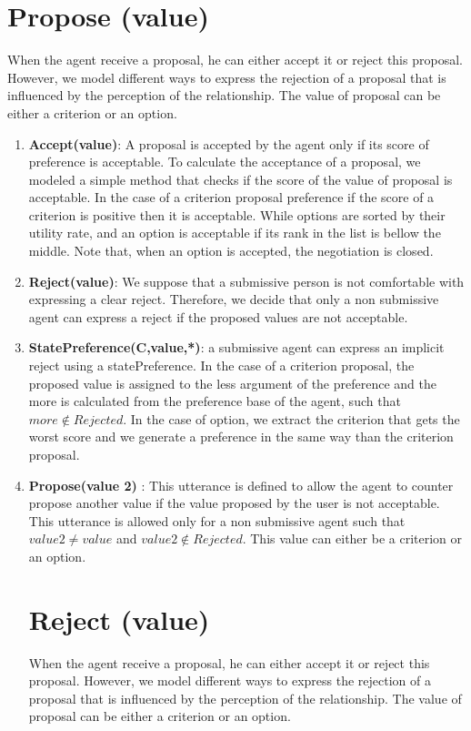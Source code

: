 \documentclass{llncs}
\begin{document}
\section{Propose (value)}
	\par When the agent receive a proposal, he can either accept it or reject this proposal. However, we model different ways to express the rejection of a proposal that is influenced by the perception of the relationship. The value of proposal can be either a criterion or an option.
		\begin{enumerate}
			
			\item \textbf{Accept(value)}: A proposal is accepted by the agent only if its score of preference is acceptable. To calculate the acceptance of a proposal, we modeled a simple method that checks if  the score of the value of proposal is acceptable. In the case of a criterion proposal  preference if the score of a criterion is positive then it is acceptable. While options are sorted by their utility rate, and an option is acceptable if its rank in the list is bellow the middle.  Note that, when an option is accepted, the negotiation is closed. 
			
			\item \textbf{Reject(value)}: We suppose that a submissive person is not comfortable with expressing a clear reject. Therefore, we decide that only a non submissive agent can express a reject if the proposed values are not acceptable. 
		
			\item \textbf{StatePreference(C,value,*)}: a submissive agent can express an implicit reject using a statePreference. In the case of a criterion proposal, the proposed value is assigned to the less argument of the preference and the more is calculated from the preference base of the agent, such that $more \notin Rejected$. In the case of option, we extract the criterion that gets the worst score and we generate a preference in the same way than the criterion proposal.
			
			\item \textbf{Propose(value 2)} : This utterance is defined to allow the agent to counter propose another value if the value proposed by the user is not acceptable. This utterance is allowed only for a non submissive agent such that $value2 \not = value$ and $value2 \notin Rejected$. This value can either be a criterion or an option.

\section{Reject (value)}
\par When the agent receive a proposal, he can either accept it or reject this proposal. However, we model different ways to express the rejection of a proposal that is influenced by the perception of the relationship. The value of proposal can be either a criterion or an option.
\begin{enumerate}
	

\end{enumerate}
\end{enumerate}
\end{document}
